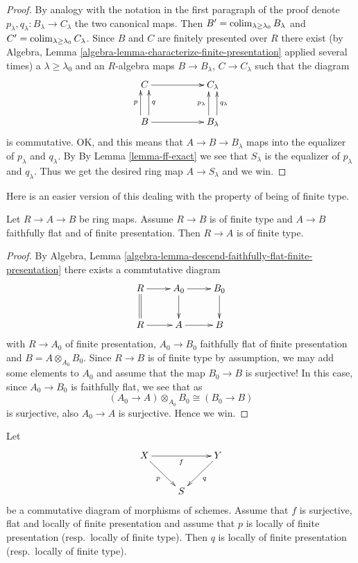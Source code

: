 \begin{proof}
\medskip\noindent
By analogy with the notation in the first paragraph of the proof denote
$p_\lambda, q_\lambda : B_\lambda \to C_\lambda$ the two canonical maps.
Then $B' = \mathop{\rm colim}\nolimits_{\lambda \geq \lambda_0} B_\lambda$
and $C' = \mathop{\rm colim}\nolimits_{\lambda \geq \lambda_0} C_\lambda$.
Since $B$ and $C$ are finitely presented over $R$ there exist
(by Algebra, Lemma \ref{algebra-lemma-characterize-finite-presentation}
applied several times)
a $\lambda \geq \lambda_0$ and an $R$-algebra maps
$B \to B_\lambda$, $C \to C_\lambda$ such that
the diagram
$$
\xymatrix{
C \ar[rr] & &
C_\lambda \\
B \ar[rr]
\ar@<1ex>[u]^-p
\ar@<-1ex>[u]_-q
& &
B_\lambda
\ar@<1ex>[u]^-{p_\lambda}
\ar@<-1ex>[u]_-{q_\lambda}
}
$$
is commutative. OK, and this means that $A \to B \to B_\lambda$
maps into the equalizer of $p_\lambda$ and $q_\lambda$. By
By Lemma \ref{lemma-ff-exact} we
see that $S_\lambda$ is the equalizer of $p_\lambda$ and $q_\lambda$.
Thus we get the desired ring map $A \to S_\lambda$ and we win.
\end{proof}

\noindent
Here is an easier version of this dealing with the property
of being of finite type.

\begin{lemma}
\label{lemma-finite-type-local-source-fppf-algebra}
Let $R \to A \to B$ be ring maps.
Assume $R \to B$ is of finite type and
$A \to B$ faithfully flat and of finite presentation.
Then $R \to A$ is of finite type.
\end{lemma}

\begin{proof}
By
Algebra, Lemma \ref{algebra-lemma-descend-faithfully-flat-finite-presentation}
there exists a commtutative diagram
$$
\xymatrix{
R \ar[r] \ar@{=}[d] &
A_0 \ar[d] \ar[r] &
B_0 \ar[d] \\
R \ar[r] & A \ar[r] & B
}
$$
with $R \to A_0$ of finite presentation,
$A_0 \to B_0$ faithfully flat of finite presentation
and $B = A \otimes_{A_0} B_0$. Since $R \to B$ is of finite
type by assumption, we may add some elements to $A_0$ and assume
that the map $B_0 \to B$ is surjective!
In this case, since $A_0 \to B_0$ is faithfully flat, we see
that as
$$
(A_0 \to A) \otimes_{A_0} B_0 \cong (B_0 \to B)
$$
is surjective, also $A_0 \to A$ is surjective. Hence we win.
\end{proof}

\begin{lemma}
\label{lemma-flat-finitely-presented-permanence}
Let
$$
\xymatrix{
X \ar[rr]_f \ar[rd]_p & &
Y \ar[dl]^q \\
& S
}
$$
be a commutative diagram of morphisms of schemes. Assume that $f$ is 
surjective, flat and locally of finite presentation and assume
that $p$ is locally of finite presentation (resp.\ locally of finite type).
Then $q$ is locally of finite presentation (resp.\ locally of finite type).
\end{lemma}

